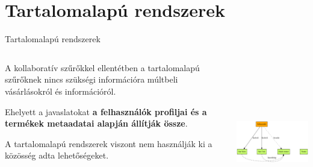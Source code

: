 \documentclass[english, aspectratio=169]{beamer}
\makeatletter
\let\origtableofcontents=\tableofcontents
\def\tableofcontents{\@ifnextchar[{\origtableofcontents}{\gobbletableofcontents}}
\def\gobbletableofcontents#1{\origtableofcontents}
\makeatother
\begin{document}
\section{Tartalomalapú rendszerek}

\begin{frame}
\tableofcontents[currentsection]
\end{frame}

\begin{frame}{Tartalomalapú rendszerek}
\begin{columns}
\begin{column}{.5\textwidth}
A kollaboratív szűrőkkel ellentétben a tartalomalapú szűrőknek nincs szükségi információra múltbeli vásárlásokról és információról.\par\medskip
Ehelyett a javaslatokat \textbf{a felhasználók profiljai és a termékek metaadatai alapján állítják össze}.\par\medskip
A tartalomalapú rendszerek viszont nem használják ki a közösség adta lehetőségeket.
\end{column}
\begin{column}{.5\textwidth}
\begin{center}
\includegraphics[width=7cm, height=7cm, keepaspectratio]{graphs/recommender_6.png}
\end{center}
\end{column}
\end{columns}
\end{frame}
\end{document}

